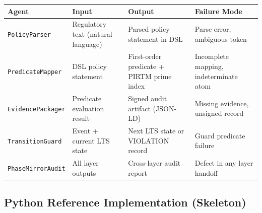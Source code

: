 \documentclass[12pt,letterpaper]{article}
\theoremstyle{definition}
\theoremstyle{plain}
\theoremstyle{remark}
\begin{document}
\begin{center}
\begin{tabular}{p{2.4cm}p{3.8cm}p{3.8cm}p{2.6cm}}
\toprule
\textbf{Agent} & \textbf{Input} & \textbf{Output} & \textbf{Failure Mode} \\
\midrule
\texttt{PolicyParser} &
  Regulatory text (natural language) &
  Parsed policy statement in DSL &
  Parse error, ambiguous token \\
\addlinespace
\texttt{PredicateMapper} &
  DSL policy statement &
  First-order predicate + PIRTM prime index &
  Incomplete mapping, indeterminate atom \\
\addlinespace
\texttt{EvidencePackager} &
  Predicate evaluation result &
  Signed audit artifact (JSON-LD) &
  Missing evidence, unsigned record \\
\addlinespace
\texttt{TransitionGuard} &
  Event + current LTS state &
  Next LTS state or VIOLATION record &
  Guard predicate failure \\
\addlinespace
\texttt{PhaseMirrorAudit} &
  All layer outputs &
  Cross-layer audit report &
  Defect in any layer handoff \\
\bottomrule
\end{tabular}
\end{center}

\subsection{Python Reference Implementation (Skeleton)}
\end{document}
